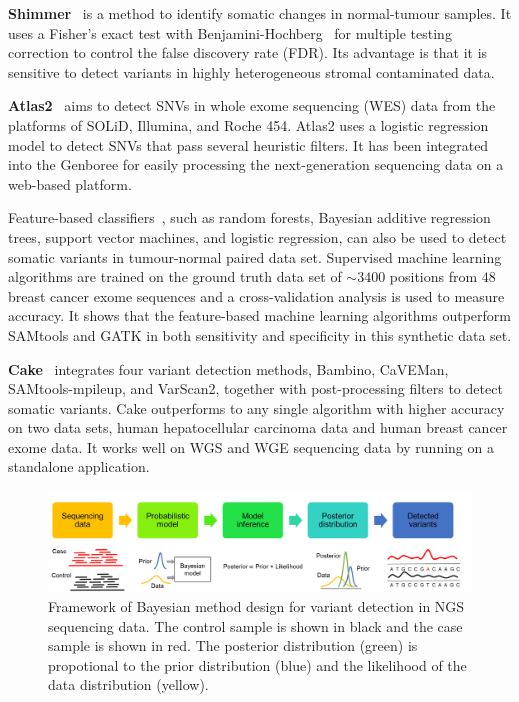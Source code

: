\documentclass[a4,center,fleqn]{NAR}
\begin{document}
\textbf{Shimmer}~\citep{Hansen2013} is a method to identify somatic changes in normal-tumour samples.
It uses a Fisher's exact test with Benjamini-Hochberg~\citep{benjamini1995controlling} for multiple testing correction to control the false discovery rate (FDR).
Its advantage is that it is sensitive to detect variants in highly heterogeneous stromal contaminated data.

\textbf{Atlas2}~\citep{challis2012integrative} aims to detect SNVs in whole exome sequencing (WES) data from the platforms of SOLiD, Illumina, and Roche 454.
Atlas2 uses a logistic regression model to detect SNVs that pass several heuristic filters.
It has been integrated into the Genboree for easily processing the next-generation sequencing data on a web-based platform.

Feature-based classifiers~\citep{Ding2012}, such as random forests, Bayesian additive regression trees, support vector machines, and logistic regression, can also be used to detect somatic variants in tumour-normal paired data set.
Supervised machine learning algorithms are trained on the ground truth data set of $\sim 3400$ positions from $48$ breast cancer exome sequences and a cross-validation analysis is used to measure accuracy.
It shows that the feature-based machine learning algorithms outperform SAMtools and GATK in both sensitivity and specificity in this synthetic data set.

\textbf{Cake}~\citep{rashid2013cake} integrates four variant detection methods, Bambino, CaVEMan, SAMtools-mpileup, and VarScan2, together with post-processing filters to detect somatic variants.
Cake outperforms to any single algorithm with higher accuracy on two data sets, human hepatocellular carcinoma data and human breast cancer exome data.
It works well on WGS and WGE sequencing data by running on a standalone application.


\begin{figure}[htbp]
\centering
\includegraphics[width=1\textwidth]{bayesian.png}
\caption{Framework of Bayesian method design for variant detection in NGS sequencing data.
The control sample is shown in black and the case sample is shown in red.
The posterior distribution (green) is propotional to the prior distribution (blue) and the likelihood of the data distribution (yellow).}
\label{fig:Bayesian}
\end{figure}
\end{document}
